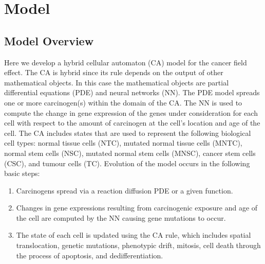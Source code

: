 \documentclass[\main/thesis.tex]{subfiles}
\begin{document}
\chapter{Model}

\section{Model Overview}

Here we develop a hybrid cellular automaton (CA) model for the cancer field effect. The CA is hybrid since its rule depends on the output of other mathematical objects. In this case the mathematical objects are partial differential equations (PDE) and neural networks (NN). The PDE model spreads one or more carcinogen(s) within the domain of the CA. The NN is used to compute the change in gene expression of the genes under consideration for each cell with respect to the amount of carcinogen at the cell's location and age of the cell. The CA includes states that are used to represent the following biological cell types: normal tissue cells (NTC), mutated normal tissue cells (MNTC), normal stem cells (NSC), mutated normal stem cells (MNSC), cancer stem cells (CSC), and tumour cells (TC). Evolution of the model occurs in the following basic steps:
\begin{enumerate}
	\item Carcinogens spread via a reaction diffusion PDE or a given function.
	\item Changes in gene expressions resulting from carcinogenic exposure and age of the cell are computed by the NN causing gene mutations to occur.
	\item The state of each cell is updated using the CA rule, which includes spatial translocation, genetic mutations, phenotypic drift, mitosis, cell death through the process of apoptosis, and dedifferentiation. 
\end{enumerate}
\end{document}
